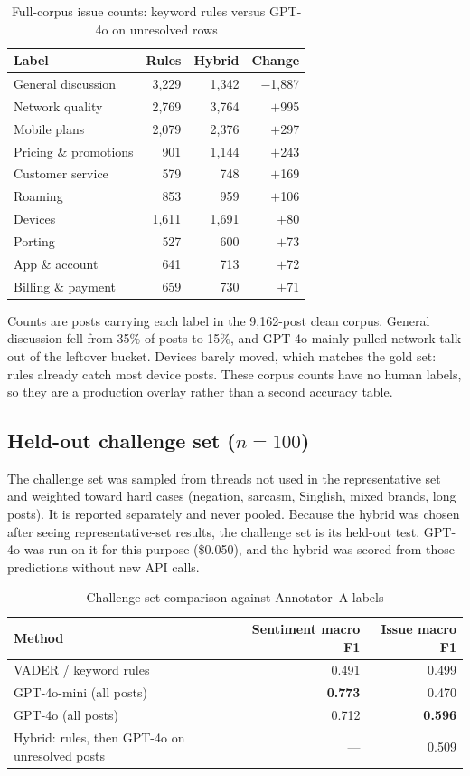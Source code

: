 \documentclass[11pt,a4paper]{article}
\begin{document}
\begin{table}[H]
\centering
\caption{Full-corpus issue counts: keyword rules versus GPT-4o on unresolved rows}
\label{tab:corpushybrid}
\begin{tabular}{lrrr}
\toprule
\textbf{Label} & \textbf{Rules} & \textbf{Hybrid} & \textbf{Change} \\
\midrule
General discussion & 3,229 & 1,342 & $-$1,887 \\
Network quality & 2,769 & 3,764 & $+$995 \\
Mobile plans & 2,079 & 2,376 & $+$297 \\
Pricing \& promotions & 901 & 1,144 & $+$243 \\
Customer service & 579 & 748 & $+$169 \\
Roaming & 853 & 959 & $+$106 \\
Devices & 1,611 & 1,691 & $+$80 \\
Porting & 527 & 600 & $+$73 \\
App \& account & 641 & 713 & $+$72 \\
Billing \& payment & 659 & 730 & $+$71 \\
\bottomrule
\end{tabular}
\end{table}

Counts are posts carrying each label in the 9,162-post clean corpus. General discussion fell from 35\% of posts to 15\%, and GPT-4o mainly pulled network talk out of the leftover bucket. Devices barely moved, which matches the gold set: rules already catch most device posts. These corpus counts have no human labels, so they are a production overlay rather than a second accuracy table.

\subsection{Held-out challenge set ($n=100$)}
\label{sec:challenge}

The challenge set was sampled from threads not used in the representative set and weighted toward hard cases (negation, sarcasm, Singlish, mixed brands, long posts). It is reported separately and never pooled. Because the hybrid was chosen after seeing representative-set results, the challenge set is its held-out test. GPT-4o was run on it for this purpose (\$0.050), and the hybrid was scored from those predictions without new API calls.

\begin{table}[H]
\centering
\caption{Challenge-set comparison against Annotator~A labels}
\label{tab:challenge}
\begin{tabular}{lrr}
\toprule
\textbf{Method} & \textbf{Sentiment macro F1} & \textbf{Issue macro F1} \\
\midrule
VADER / keyword rules & 0.491 & 0.499 \\
GPT-4o-mini (all posts) & \textbf{0.773} & 0.470 \\
GPT-4o (all posts) & 0.712 & \textbf{0.596} \\
Hybrid: rules, then GPT-4o on unresolved posts & --- & 0.509 \\
\bottomrule
\end{tabular}
\end{table}
\end{document}
